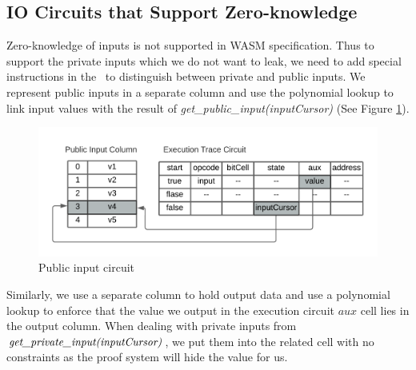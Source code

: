 \subsection{IO Circuits that Support Zero-knowledge}
Zero-knowledge of inputs is not supported in WASM specification. Thus to support the private inputs which we do not want to leak, we need to add special instructions in the \zkwasm\, to distinguish between private and public inputs. We represent public inputs in a separate column and use the polynomial lookup to link input values with the result of \emph{get\_public\_input(inputCursor)} (See Figure \ref{fig:public-input}).
\begin{figure}[!ht]
\centerline{
\includegraphics[scale=0.7]{figs/public-input.png}
}
\caption{Public input circuit}\label{fig:public-input}
\end{figure}
 Similarly, we use a separate column to hold output data and use a polynomial lookup to enforce that the value we output in the execution circuit $aux$ cell lies in the output column. When dealing with private inputs from $\emph{get\_private\_input(inputCursor)}$, we put them into the related cell with no constraints as the proof system will hide the value for us.
